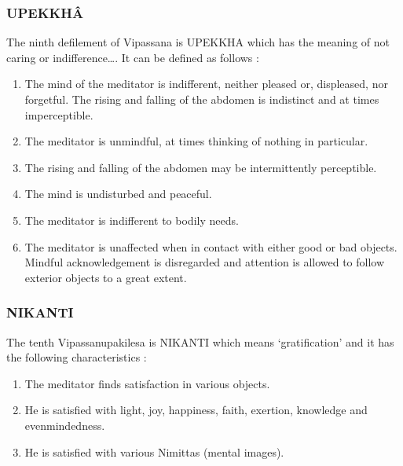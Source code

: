 \documentclass[a5paper,10pt,english]{book}
\begin{document}
\subsubsection{UPEKKHÂ}
\label{\detokenize{progress:upekkha}}
\sphinxAtStartPar
The ninth defilement of Vipassana is UPEKKHA which has the meaning of not caring or indifference…. It can be defined as follows :\sphinxhyphen{}
\begin{enumerate}
%
\item {} 
\sphinxAtStartPar
The mind of the meditator is indifferent, neither pleased or, displeased, nor forgetful. The rising and falling of the abdomen is indistinct and at times imperceptible.

\item {} 
\sphinxAtStartPar
The meditator is unmindful, at times thinking of nothing in particular.

\item {} 
\sphinxAtStartPar
The rising and falling of the abdomen may be intermittently perceptible.

\item {} 
\sphinxAtStartPar
The mind is undisturbed and peaceful.

\item {} 
\sphinxAtStartPar
The meditator is indifferent to bodily needs.

\item {} 
\sphinxAtStartPar
The meditator is unaffected when in contact with either good or bad objects. Mindful acknowledgement is disregarded and attention is allowed to follow exterior objects to a great extent.

\end{enumerate}


\subsubsection{NIKANTI}
\label{\detokenize{progress:nikanti}}
\sphinxAtStartPar
The tenth Vipassanupakilesa is NIKANTI which means ‘gratification’ and it has the following characteristics :\sphinxhyphen{}
\begin{enumerate}
%
\item {} 
\sphinxAtStartPar
The meditator finds satisfaction in various objects.

\item {} 
\sphinxAtStartPar
He is satisfied with light, joy, happiness, faith, exertion, knowledge and even\sphinxhyphen{}mindedness.

\item {} 
\sphinxAtStartPar
He is satisfied with various Nimittas (mental images).

\end{enumerate}
\end{document}
